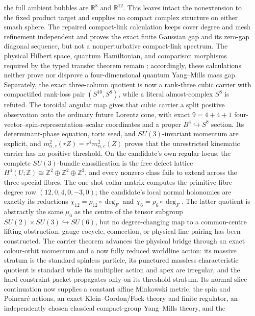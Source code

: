 the full ambient bubbles are \(\mathbb R^8\) and \(\mathbb R^{12}\).
This leaves intact the
nonextension to the fixed product target and supplies no compact complex
structure on either smash sphere.  The repaired compact-link calculation
keeps cover degree and mesh refinement independent and proves the exact
finite Gaussian gap and its zero-gap diagonal sequence, but not a
nonperturbative compact-link spectrum.  The physical Hilbert space, quantum
Hamiltonian, and comparison morphisms required by the typed transfer theorem
remain \Open; accordingly, these calculations neither prove nor disprove a
four-dimensional quantum Yang--Mills mass gap.  Separately, the exact
three-column quotient is now a rank-three cubic carrier with compactified
rank-loss pair \((S^{10},S^8)\), while a literal almost-complex \(S^8\) is
refuted.  The toroidal angular map gives that cubic carrier a split positive
observation onto the ordinary future Lorentz cone, with exact
\(9=4+4+1\) four-vector--spin-representation--scalar coordinates and a
proper \(B^4\hookrightarrow S^8\) section.  Its determinant-phase equation,
toric seed, and \(SU(3)\)-invariant momentum are explicit, and
\(m_{\alpha,c}^2(rZ)=r^4m_{\alpha,c}^2(Z)\) proves that the unrestricted
kinematic carrier has no positive threshold.  On the candidate's own regular
locus, the complete \(SU(3)\)-bundle
 classification is the free defect lattice
 \(H^4(U;\mathbb Z)\cong\mathbb Z^2\oplus\mathbb Z^2\oplus\mathbb Z^2\),
 and every nonzero class fails to extend across the three special fibres.
 The one-shot collar matrix computes the primitive fibre-degree row
 \((12,0,4,0,-3,0)\); the candidate's local normal holonomies are exactly its
 reductions \(\chi_{12}=\rho_{12}\circ\deg_F\) and
 \(\chi_6=\rho_6\circ\deg_F\).  The latter quotient is abstractly the same
 \(\mu_6\) as the centre of the tensor subgroup
 \(SU(2)\times SU(3)\hookrightarrow SU(6)\), but no degree-changing map to a
 common-centre lifting obstruction, gauge cocycle, connection, or physical
 line pairing has been constructed.
 The carrier theorem advances the physical bridge through an exact
colour-orbit momentum and a now fully reduced worldline action: its massive
stratum is the standard spinless particle, its punctured massless
characteristic quotient is standard while its multiplier action and apex are
irregular, and the hard-constraint packet propagates only on its threshold
stratum.  Its normal-slice
continuation now supplies a constant affine Minkowski metric, the spin and
Poincar\'e actions, an exact Klein--Gordon/Fock theory and finite regulator,
an independently chosen classical compact-group Yang--Mills theory, and the
